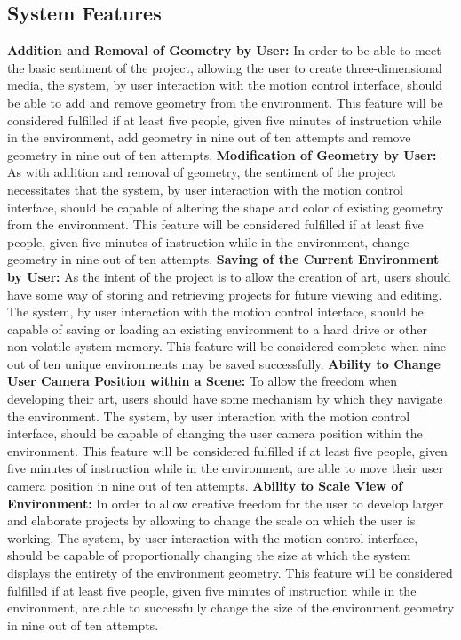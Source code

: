 \documentclass[onecolumn, draftclsnofoot,10pt, compsoc]{IEEEtran}
\begin{document}
\subsection{System Features} 
\textbf{Addition and Removal of Geometry by User:}
\newline
In order to be able to meet the basic sentiment of the project, allowing the user to create three-dimensional media, the system, by user interaction with the motion control interface, should be able to add and remove geometry from the environment. This feature will be considered fulfilled if at least five people, given five minutes of instruction while in the environment, add geometry in nine out of ten attempts and remove geometry in nine out of ten attempts.
\newline 
\textbf{Modification of Geometry by User:}
\newline
As with addition and removal of geometry, the sentiment of the project necessitates that the system, by user interaction with the motion control interface, should be capable of altering the shape and color of existing geometry from the environment. This feature will be considered fulfilled if at least five people, given five minutes of instruction while in the environment, change geometry in nine out of ten attempts.
\newline 
\textbf{Saving of the Current Environment by User:}
\newline
As the intent of the project is to allow the creation of art, users should have some way of storing and retrieving projects for future viewing and editing. The system, by user interaction with the motion control interface, should be capable of saving or loading an existing environment to a hard drive or other non-volatile system memory. This feature will be considered complete when nine out of ten unique environments may be saved successfully.
\newline 
\textbf{Ability to Change User Camera Position within a Scene:}
\newline
To allow the freedom when developing their art, users should have some mechanism by which they navigate the environment. The system, by user interaction with the motion control interface, should be capable of changing the user camera position within the environment. This feature will be considered fulfilled if at least five people, given five minutes of instruction while in the environment, are able to move their user camera position in nine out of ten attempts.
\newline 
\textbf{Ability to Scale View of Environment:}
\newline
In order to allow creative freedom for the user to develop larger and elaborate projects by allowing to change the scale on which the user is working. The system, by user interaction with the motion control interface, should be capable of proportionally changing the size at which the system displays the entirety of the environment geometry. This feature will be considered fulfilled if at least five people, given five minutes of instruction while in the environment, are able to successfully change the size of the environment geometry in nine out of ten attempts.
\end{document}
